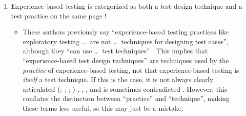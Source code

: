 \begin{enumerate}
      \item Experience-based testing is categorized as both a test design
            technique and a test practice on the same page
            \citep[pp.~22, 34]{IEEE2022}!
            \ifnotpaper
                  \begin{itemize}
                        \item These authors previously say ``experience-based testing
                              practices like exploratory testing \dots\ are not
                              \dots\ techniques for designing test cases'', although
                              they ``can use \dots\ test techniques''
                              \citeyearpar[p.~viii]{IEEE2021}. This implies that
                              ``experience-based test design techniques'' are
                              techniques used by the \emph{practice} of experience-based
                              testing, not that experience-based testing is
                              \emph{itself} a test technique. If this is the case, it
                              is not always clearly articulated
                              \ifnotpaper
                                    (\citealp[pp.~4,~22]{IEEE2022}; \citeyear[p.~4]{IEEE2021};
                                    \citealp[p.~5-13]{SWEBOK2024}; \citealpISTQB{})
                              \else
                                    \cite[pp.~4,~22]{IEEE2022}, \cite[p.~4]{IEEE2021},
                                    \cite[p.~5-13]{SWEBOK2024}, \cite{ISTQB}
                              \fi
                              and is
                              sometimes contradicted \citep[p.~46]{Firesmith2015}.
                              However, this conflates the distinction between
                              ``practice'' and ``technique'', making these terms less
                              useful, so this may just be a mistake.


\end{itemize}
\end{enumerate}
